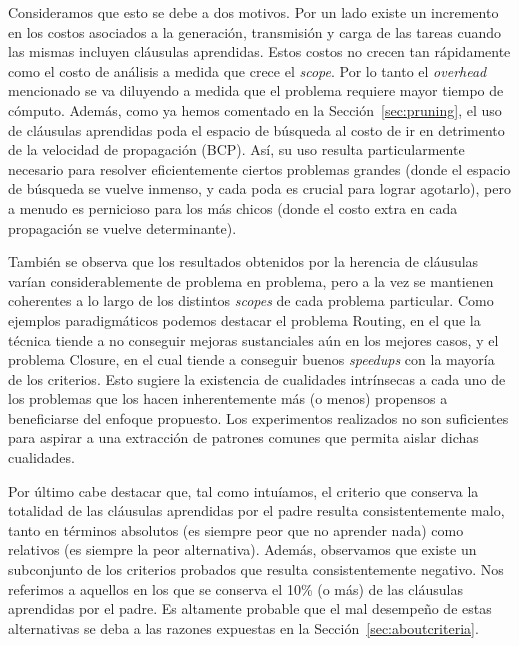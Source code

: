 Consideramos que esto se debe a dos motivos. Por un lado existe un incremento
en los costos asociados a la generación, transmisión y carga de las tareas
cuando las mismas incluyen cláusulas aprendidas. Estos costos no crecen tan
rápidamente como el costo de análisis a medida que crece el \emph{scope}. Por
lo tanto el \emph{overhead} mencionado se va diluyendo a medida que el
problema requiere mayor tiempo de cómputo. Además, como ya hemos comentado en
la Sección~\ref{sec:pruning}, el uso de cláusulas aprendidas poda el espacio
de búsqueda al costo de ir en detrimento de la velocidad de propagación (BCP).
Así, su uso resulta particularmente necesario para resolver eficientemente
ciertos problemas grandes (donde el espacio de búsqueda se vuelve inmenso, y
cada poda es crucial para lograr agotarlo), pero a menudo es pernicioso para
los más chicos (donde el costo extra en cada propagación se vuelve
determinante).

También se observa que los resultados obtenidos por la herencia de cláusulas
varían considerablemente de problema en problema, pero a la vez se mantienen
coherentes a lo largo de los distintos \emph{scopes} de cada problema
particular. Como ejemplos paradigmáticos podemos destacar el problema Routing,
en el que la técnica tiende a no conseguir mejoras sustanciales aún en los
mejores casos, y el problema Closure, en el cual tiende a conseguir buenos
\emph{speedups} con la mayoría de los criterios. Esto sugiere la existencia de
cualidades intrínsecas a cada uno de los problemas que los hacen
inherentemente más (o menos) propensos a beneficiarse del enfoque propuesto.
Los experimentos realizados no son suficientes para aspirar a una extracción
de patrones comunes que permita aislar dichas cualidades.


Por último cabe destacar que, tal como intuíamos, el criterio que conserva la
totalidad de las cláusulas aprendidas por el padre resulta consistentemente
malo, tanto en términos absolutos (es siempre peor que no aprender nada) como
relativos (es siempre la peor alternativa). Además, observamos que existe un
subconjunto de los criterios probados que resulta consistentemente negativo.
Nos referimos a aquellos en los que se conserva el 10\% (o más) de las
cláusulas aprendidas por el padre. Es altamente probable que el mal desempeño
de estas alternativas se deba a las razones expuestas en la
Sección~\ref{sec:aboutcriteria}.

